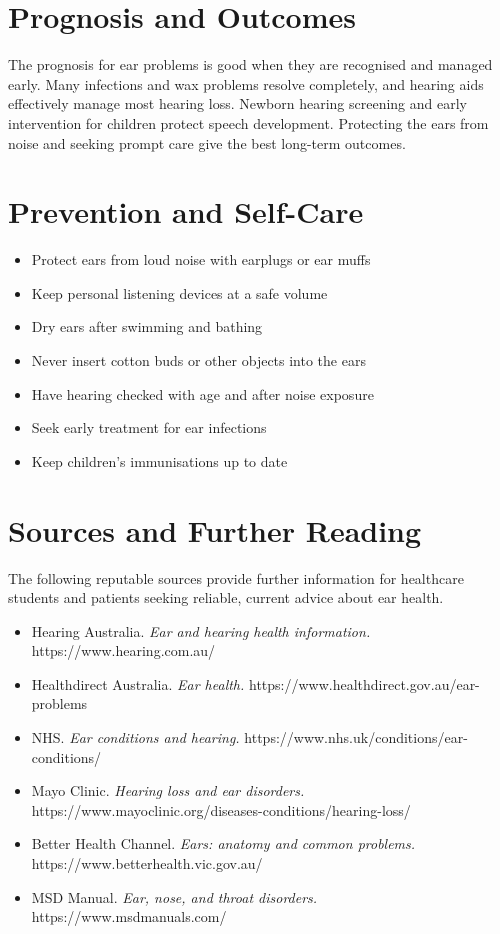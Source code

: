 \section*{Prognosis and Outcomes}
The prognosis for ear problems is good when they are recognised and managed early. Many infections and wax problems resolve completely, and hearing aids effectively manage most hearing loss. Newborn hearing screening and early intervention for children protect speech development. Protecting the ears from noise and seeking prompt care give the best long-term outcomes.

\section*{Prevention and Self-Care}
\begin{itemize}
    \item Protect ears from loud noise with earplugs or ear muffs
    \item Keep personal listening devices at a safe volume
    \item Dry ears after swimming and bathing
    \item Never insert cotton buds or other objects into the ears
    \item Have hearing checked with age and after noise exposure
    \item Seek early treatment for ear infections
    \item Keep children's immunisations up to date
\end{itemize}

\section*{Sources and Further Reading}
The following reputable sources provide further information for healthcare students and patients seeking reliable, current advice about ear health.
\begin{itemize}
    \item Hearing Australia. \textit{Ear and hearing health information.} https://www.hearing.com.au/
    \item Healthdirect Australia. \textit{Ear health.} https://www.healthdirect.gov.au/ear-problems
    \item NHS. \textit{Ear conditions and hearing.} https://www.nhs.uk/conditions/ear-conditions/
    \item Mayo Clinic. \textit{Hearing loss and ear disorders.} https://www.mayoclinic.org/diseases-conditions/hearing-loss/
    \item Better Health Channel. \textit{Ears: anatomy and common problems.} https://www.betterhealth.vic.gov.au/
    \item MSD Manual. \textit{Ear, nose, and throat disorders.} https://www.msdmanuals.com/
\end{itemize}
